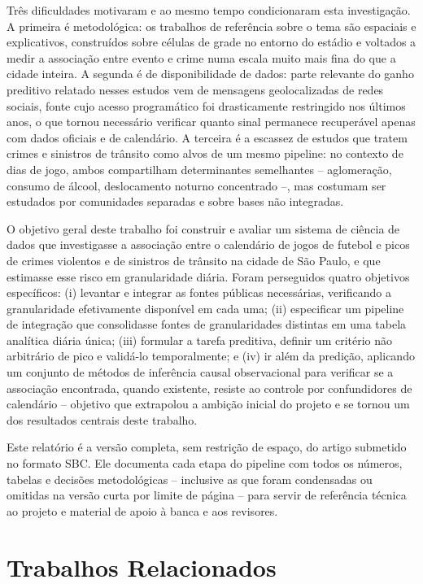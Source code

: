 \documentclass[12pt]{article}
\begin{document}
Três dificuldades motivaram e ao mesmo tempo condicionaram esta
investigação. A primeira é metodológica: os trabalhos de referência sobre
o tema \cite{kurland2014,ristea2018,ristea2020} são espaciais e
explicativos, construídos sobre células de grade no entorno do estádio e
voltados a medir a associação entre evento e crime numa escala muito mais
fina do que a cidade inteira. A segunda é de disponibilidade de dados:
parte relevante do ganho preditivo relatado nesses estudos vem de
mensagens geolocalizadas de redes sociais, fonte cujo acesso programático
foi drasticamente restringido nos últimos anos, o que tornou necessário
verificar quanto sinal permanece recuperável apenas com dados oficiais e
de calendário. A terceira é a escassez de estudos que tratem crimes e
sinistros de trânsito como alvos de um mesmo pipeline: no contexto de
dias de jogo, ambos compartilham determinantes semelhantes --
aglomeração, consumo de álcool, deslocamento noturno concentrado --, mas
costumam ser estudados por comunidades separadas e sobre bases não
integradas.

O objetivo geral deste trabalho foi construir e avaliar um sistema de
ciência de dados que investigasse a associação entre o calendário de
jogos de futebol e picos de crimes violentos e de sinistros de trânsito
na cidade de São Paulo, e que estimasse esse risco em granularidade
diária. Foram perseguidos quatro objetivos específicos: (i) levantar e
integrar as fontes públicas necessárias, verificando a granularidade
efetivamente disponível em cada uma; (ii) especificar um pipeline de
integração que consolidasse fontes de granularidades distintas em uma
tabela analítica diária única; (iii) formular a tarefa preditiva, definir
um critério não arbitrário de pico e validá-lo temporalmente; e (iv) ir
além da predição, aplicando um conjunto de métodos de inferência causal
observacional para verificar se a associação encontrada, quando
existente, resiste ao controle por confundidores de calendário --
objetivo que extrapolou a ambição inicial do projeto e se tornou um dos
resultados centrais deste trabalho.

Este relatório é a versão completa, sem restrição de espaço, do artigo
submetido no formato SBC. Ele documenta cada etapa do pipeline com todos
os números, tabelas e decisões metodológicas -- inclusive as que foram
condensadas ou omitidas na versão curta por limite de página -- para
servir de referência técnica ao projeto e material de apoio à banca e aos
revisores.

\section{Trabalhos Relacionados}
\end{document}
